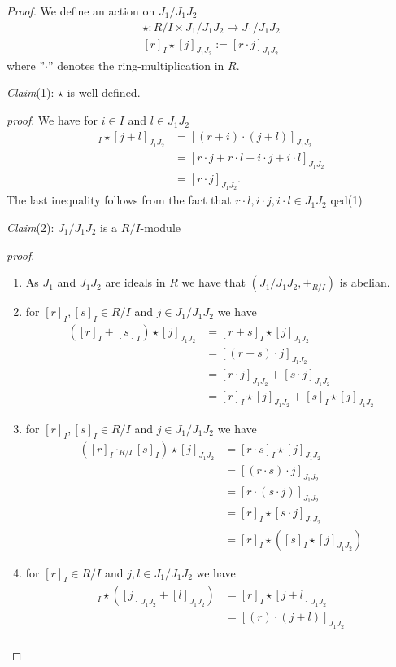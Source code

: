 \documentclass{article}
\newcommand{\subclaim}[1]
{

	\vspace*{0,2cm}
	\textit{Claim}({#1}):
}
\newcommand{\subqed}[1]{\hfill\textsf{qed}({#1})}
\newcommand{\subproof}{

\noindent\textit{proof}.\hspace{0,1cm}
}
\theoremstyle{definition}
\theoremstyle{plain}
\theoremstyle{remark}
\begin{document}
\begin{proof}
	We define an action on $J_1/J_1J_2$
	\begin{align}
		\star:R/I\times J_1/J_1J_2 \rightarrow J_1/J_1J_2 \\
		[r]_I\star[j]_{J_1J_2} := [r \cdot j]_{J_1J_2}
	\end{align}
	where ''$\cdot$'' denotes the ring-multiplication in $R$.
	\subclaim1 $\star$ is well defined.
	\subproof We have for $i\in I$ and $l\in J_1J_2$
	\begin{align}
		[r+i]_I\star[j+l]_{J_1J_2} &= [(r+i)\cdot (j+l)]_{J_1J_2}\\
					   &= [r\cdot j + r\cdot l + i\cdot j + i\cdot l]_{J_1J_2}\\
					   &= [r\cdot j]_{J_1J_2}.
	\end{align}
	The last inequality follows from the fact that $r\cdot l, i\cdot j, i\cdot l \in J_1J_2$ \subqed1
	\subclaim2 $J_1/J_1J_2$ is a $R/I$-module
	\subproof
	\begin{enumerate}
		\item As $J_1$ and $J_1J_2$ are ideals in $R$ we have that $(J_1/J_1J_2,+_{R/I})$ is abelian.
		\item for $[r]_I,[s]_I\in R/I$ and $j\in J_1/J_1J_2$ we have 
			\begin{align}
				([r]_I+[s]_I)\star [j]_{J_1J_2} &= [r+s]_I\star[j]_{J_1J_2} \\
								&= [(r+s)\cdot j]_{J_1J_2} \\
								&= [r\cdot j]_{J_1J_2}+[s\cdot j]_{J_1J_2} \\
								&= [r]_I\star[j]_{J_1J_2}+[s]_I\star[j]_{J_1J_2}
			\end{align}
		\item for $[r]_I,[s]_I\in R/I$ and $j\in J_1/J_1J_2$ we have
			\begin{align}
				([r]_I\cdot_{R/I}[s]_I)\star [j]_{J_1J_2} &= [r\cdot s]_I\star[j]_{J_1J_2} \\
								&= [(r\cdot s)\cdot j]_{J_1J_2} \\
								&= [r\cdot (s\cdot j)]_{J_1J_2} \\
								&= [r]_I\star[s\cdot j]_{J_1J_2}\\
								&= [r]_I\star([s]_I\star [j]_{J_1J_2})
			\end{align}
		\item for $[r]_I\in R/I$ and $j,l\in J_1/J_1J_2$ we have
			\begin{align}
				[r]_I\star ([j]_{J_1J_2}+[l]_{J_1J_2}) &= [r]_I\star[j+l]_{J_1J_2} \\
								       &= [(r)\cdot (j+l)]_{J_1J_2} \\

\end{align}
\end{enumerate}
\end{proof}
\end{document}
